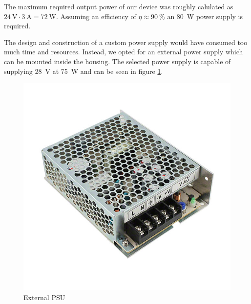 The maximum required  output  power  of  our  device  was  roughly  calulated as
$\SI{24}{\volt} \cdot \SI{3}{\ampere} = \SI{72}{\watt}$.  Assuming an efficiency
of $\eta\approx \SI{90}{\percent}$ an \SI{80}{W} power supply is required.

The design and construction of a  custom  power  supply  would have consumed too
much  time and resources. Instead, we opted for an external power  supply  which
can be mounted inside the  housing.  The  selected  power  supply  is capable of
supplying  \SI{28}{\volt}  at   \SI{75}{\watt}   and   can  be  seen  in  figure
\ref{fig:circuit:mains-input}.

\begin{figure}[th!]
    \centering
    \begin{minipage}{.3\textwidth}
        \centering
        \includegraphics[width=\textwidth]{images/circuit/external-power-supply.JPG}
        \caption{External PSU}
        \label{fig:circuit:mains-input}
    \end{minipage}
    \begin{minipage}{.3\textwidth}
        \centering

\end{minipage}
\end{figure}

